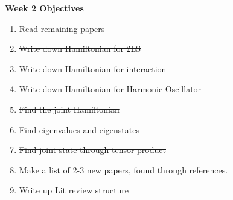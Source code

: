 \documentclass{article}
\begin{document}
\Large{\textbf{Week 2 Objectives}}
\\
\begin{enumerate}
    \item Read remaining papers
    \item\sout{Write down Hamiltonian for 2LS}
    \item \sout{Write down Hamiltonian for interaction}
    \item \sout{Write down Hamiltonian for Harmonic Oscillator}
    \item \sout{Find the joint Hamiltonian }
    \item \sout{Find eigenvalues and eigenstates}
    \item \sout{Find joint state through tensor product}
    \item \sout{Make a list of 2-3 new papers, found through references.}
    \item Write up Lit review structure


\end{enumerate}
\end{document}
